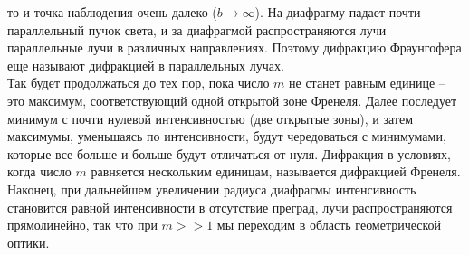 \documentclass[__main__.tex]{subfiles}
\begin{document}
то и точка наблюдения очень далеко ($b \rightarrow \infty$). На диафрагму падает почти параллельный пучок света, и за диафрагмой распространяются лучи параллельные лучи в различных направлениях. Поэтому дифракцию Фраунгофера еще называют дифракцией в параллельных лучах.\\
Так будет продолжаться до тех пор, пока число $m$ не станет равным единице – это максимум, соответствующий одной открытой зоне Френеля. Далее последует минимум с почти нулевой интенсивностью (две открытые зоны), и затем максимумы, уменьшаясь по интенсивности, будут чередоваться с минимумами, которые все больше и больше будут отличаться от нуля. Дифракция в условиях, когда число $m$ равняется нескольким единицам, называется дифракцией Френеля.
Наконец, при дальнейшем увеличении радиуса диафрагмы интенсивность становится равной интенсивности в отсутствие преград, лучи распространяются прямолинейно, так что при $m >> 1$ мы переходим в область геометрической
оптики.\\
\end{document}

